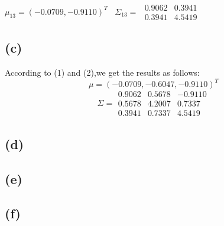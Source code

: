 \documentclass[10pt,a4paper]{article}
\begin{document}
	$\mu_{13}=(-0.0709,-0.9110)^T$ \ $\Sigma_{13}=$
	$\begin{array}{cc}
	0.9062& 0.3941  \\ 
	0.3941& 4.5419 
	\end{array} 
	$
	\subsection{(c)}
	According to (1) and (2),we get the results as follows:
	\begin{equation*}
	\mu=(-0.0709,-0.6047,-0.9110)^T
	\end{equation*}
	\begin{equation*}
	\Sigma=\begin{array}{ccc}
	0.9062& 0.5678  & -0.9110  \\ 
	0.5678& 4.2007 & 0.7337  \\ 
	0.3941& 0.7337  &4.5419 
	\end{array} 
	\end{equation*}
	\subsection{(d)}
	
	\subsection{(e)}
	\subsection{(f)}
\end{document}
